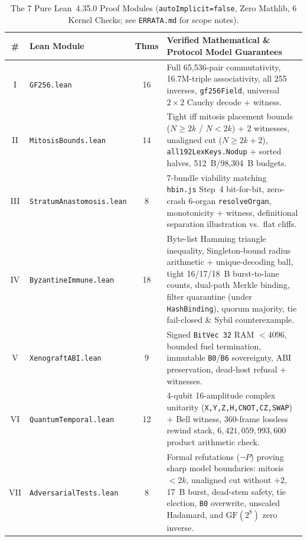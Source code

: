 \documentclass[10pt,letterpaper]{article}
\begin{document}
\begin{table}[ht]
\centering
\caption[The 7 Pure Lean~4.35.0 Proof Modules (6 Kernel Checks)]{The 7 Pure Lean~4.35.0 Proof Modules (\texttt{autoImplicit=false}, Zero Mathlib, 6 Kernel Checks; see \texttt{ERRATA.md} for scope notes).}
\label{tab:lean-modules}
\footnotesize
\begin{tabularx}{\textwidth}{@{} c L{3.6cm} c Y @{}}
\toprule
\textbf{\#} & \textbf{Lean Module} & \textbf{Thms} & \textbf{Verified Mathematical \& Protocol Model Guarantees} \\
\midrule
I & \texttt{GF256.lean} & 16 & Full 65,536-pair commutativity, 16.7M-triple associativity, all 255 inverses, \texttt{gf256Field}, universal $2\times 2$ Cauchy decode + witness. \\
II & \texttt{MitosisBounds.lean} & 14 & Tight iff mitosis placement bounds ($N\ge 2k$ / $N<2k$) + 2 witnesses, unaligned cut ($N\ge 2k+2$), \texttt{all192LexKeys.Nodup} + sorted halves, 512~B/98,304~B budgets. \\
III & \texttt{StratumAnastomosis.lean} & 8 & 7-bundle viability matching \texttt{hbin.js} Step~4 bit-for-bit, zero-crash 6-organ \texttt{resolveOrgan}, monotonicity + witness, definitional separation illustration vs.\ flat cliffs. \\
IV & \texttt{ByzantineImmune.lean} & 18 & Byte-list Hamming triangle inequality, Singleton-bound radius arithmetic + unique-decoding ball, tight 16/17/18~B burst-to-lane counts, dual-path Merkle binding, filter quarantine (under \texttt{HashBinding}), quorum majority, tie fail-closed \& Sybil counterexample. \\
V & \texttt{XenograftABI.lean} & 9 & Signed \texttt{BitVec 32} RAM $<4096$, bounded fuel termination, immutable \texttt{B0}/\texttt{B6} sovereignty, ABI preservation, dead-host refusal + witnesses. \\
VI & \texttt{QuantumTemporal.lean} & 12 & 4-qubit 16-amplitude complex unitarity (\texttt{X,Y,Z,H,CNOT,CZ,SWAP}) + Bell witness, 360-frame lossless rewind stack, $6{,}421{,}059{,}993{,}600$ product arithmetic check. \\
VII & \texttt{AdversarialTests.lean} & 8 & Formal refutations ($\neg P$) proving sharp model boundaries: mitosis $<2k$, unaligned cut without $+2$, 17~B burst, dead-stem safety, tie election, \texttt{B0} overwrite, unscaled Hadamard, and $\mathrm{GF}(2^8)$ zero inverse. \\
\bottomrule
\end{tabularx}
\end{table}
\end{document}

